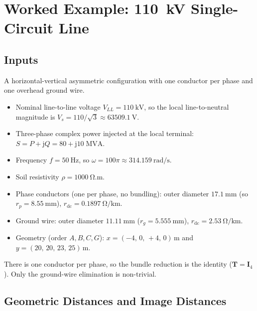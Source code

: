 \documentclass[11pt,a4paper]{article}
\newcommand{\jj}{\mathrm{j}}
\newcommand{\matT}{\bm{T}}
\newcommand{\matI}{\bm{I}}
\begin{document}
\section{Worked Example: \texorpdfstring{\SI{110}{\kilo\volt}}{110 kV} Single-Circuit Line}

\subsection{Inputs}

A horizontal-vertical asymmetric configuration with one conductor per phase
and one overhead ground wire.
\begin{itemize}
\item Nominal line-to-line voltage \(V_{LL}=\SI{110}{\kilo\volt}\), so the
local line-to-neutral magnitude is \(V_{s}=110/\sqrt{3}\approx
\SI{63509.1}{\volt}\).
\item Three-phase complex power injected at the local terminal:
\(S=P+\jj Q=80+\jj 10\;\si{\mega\volt\ampere}\).
\item Frequency \(f=\SI{50}{\hertz}\), so \(\omega=100\pi
\approx\SI{314.159}{\radian/\second}\).
\item Soil resistivity \(\rho=\SI{1000}{\ohm.\metre}\).
\item Phase conductors (one per phase, no bundling): outer diameter
\(\SI{17.1}{\milli\metre}\) (so \(r_{p}=\SI{8.55}{\milli\metre}\)),
\(r_{\mathrm{dc}}=\SI{0.1897}{\ohm/\kilo\metre}\).
\item Ground wire: outer diameter \(\SI{11.11}{\milli\metre}\)
(\(r_{g}=\SI{5.555}{\milli\metre}\)),
\(r_{\mathrm{dc}}=\SI{2.53}{\ohm/\kilo\metre}\).
\item Geometry (order \(A,B,C,G\)):
\(x=(-4,\,0,\,+4,\,0)\,\si{\metre}\) and
\(y=(20,\,20,\,23,\,25)\,\si{\metre}\).
\end{itemize}
There is one conductor per phase, so the bundle reduction is the identity
(\(\matT=\matI_{4}\)). Only the ground-wire elimination is non-trivial.

\subsection{Geometric Distances and Image Distances}
\end{document}
